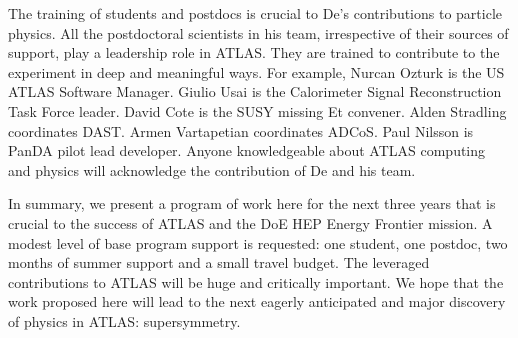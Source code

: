 The training of students and postdocs is crucial to De's contributions to particle physics. All the postdoctoral scientists in his team, irrespective of their sources of support, play a leadership role in ATLAS. They are trained to contribute to the experiment in deep and meaningful ways. For example, Nurcan Ozturk is the US ATLAS Software Manager. Giulio Usai is the Calorimeter Signal Reconstruction Task Force leader. David Cote is the SUSY missing Et convener. Alden Stradling coordinates DAST. Armen Vartapetian coordinates ADCoS. Paul Nilsson is PanDA pilot lead developer. Anyone knowledgeable about ATLAS computing and physics will acknowledge the contribution of De and his team.

In summary, we present a program of work here for the next three years that is crucial to the success of ATLAS and the DoE HEP Energy Frontier mission. A modest level of base program support is requested: one student, one postdoc, two months of summer support and a small travel budget. The leveraged contributions to ATLAS will be huge and critically important. We hope that the work proposed here will lead to the next eagerly anticipated and major discovery of physics in ATLAS: supersymmetry.

